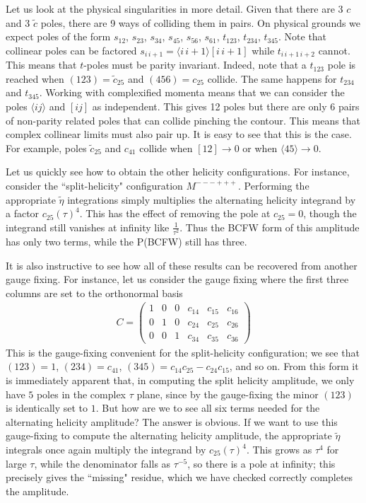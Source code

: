 \documentclass[12pt]{article}
\newcommand{\be}{\begin{eqnarray}}
\newcommand{\ee}{\end{eqnarray}}
\begin{document}
Let us look at the physical singularities in more detail. Given that there are 3 $c$ and 3 $\tilde c$ poles, there are 9 ways of colliding them in pairs. On physical grounds we expect poles of the form $s_{12}$,
$s_{23}$, $s_{34}$, $s_{45}$, $s_{56}$, $s_{61}$, $t_{123}$,
$t_{234}$, $t_{345}$. Note that collinear poles can be factored
$s_{i \,i+1} = \langle i\,i+1\rangle [i \,i+1]$ while $t_{i \,i+1 \,i+2}$
cannot. This means that $t$-poles must be parity invariant. Indeed,
note that a $t_{123}$ pole is reached when $(123)=\tilde c_{25}$ and
$(456) =c_{25}$ collide. The same happens for $t_{234}$ and
$t_{345}$. Working with complexified momenta means that we can consider the
poles $\langle ij\rangle$ and $[ij]$ as independent. This gives 12
poles but there are only 6 pairs of non-parity related poles that can
collide pinching the contour. This means that complex collinear
limits must also pair up. It is easy to see that this is the case.
For example, poles $\tilde c_{25}$ and $c_{41}$ collide when
$[12]\to 0$ or when $\langle 45\rangle \to 0$.

Let us quickly see how to obtain the other helicity configurations. For instance, consider the ``split-helicity" configuration $M^{---+++}$. Performing the appropriate $\tilde \eta$ integrations simply multiplies the alternating helicity integrand by a factor $c_{25}(\tau)^4$. This has the effect of removing the pole at $c_{25} = 0$, though the integrand still vanishes at infinity like $\frac{1}{\tau^2}$. Thus the BCFW form of this amplitude has only two terms, while the P(BCFW) still has three.

It is also instructive to see how all of these results can be recovered from another gauge fixing. For instance, let us consider the gauge fixing where the first three columns are set to the orthonormal basis
\be
\label{split}
C = \left(\begin{array}{cccccc} 1 & 0 & 0 & c_{14} & c_{15} & c_{16} \\ 0 & 1 & 0 & c_{24} & c_{25} & c_{26}  \\ 0 & 0 & 1 & c_{34} & c_{35} & c_{36} \end{array} \right)
\ee
This is the gauge-fixing convenient for the split-helicity configuration; we see that $(123)=1$, $(234) = c_{41}$, $(345) = c_{14}c_{25}-c_{24}c_{15}$, and so on.
From this form it is immediately apparent that, in computing the split helicity amplitude,  we only have $5$ poles in the complex $\tau$ plane,  since by the gauge-fixing the minor $(123)$ is identically set to $1$. But how are we to see all six terms needed for the alternating helicity amplitude? The answer is obvious. If we want to use this gauge-fixing to compute the alternating helicity amplitude, the appropriate $\tilde \eta$ integrals once again multiply the integrand by $c_{25}(\tau)^4$. This grows as $\tau^4$ for large $\tau$, while the denominator falls as $\tau^{-5}$, so there is a pole at infinity; this precisely gives the ``missing" residue, which we have checked correctly completes the amplitude.
\end{document}

